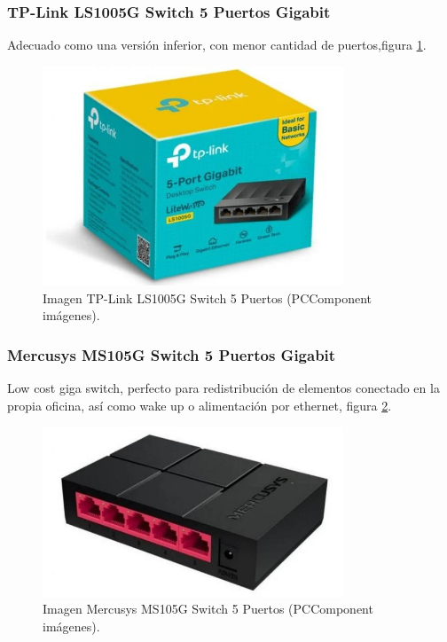 \subsubsection{TP-Link LS1005G Switch 5 Puertos Gigabit}
Adecuado como una versión inferior, con menor cantidad de puertos,figura \ref{F:giga_switch_5p}.
\begin{figure}[htbp]
\begin{center}
\includegraphics[width=0.8\textwidth]{./figuras/giga_switch_5p}
\caption{Imagen TP-Link LS1005G Switch 5 Puertos (PCComponent imágenes).}
\label{F:giga_switch_5p}
\end{center}
\end{figure}
\subsubsection{Mercusys MS105G Switch 5 Puertos Gigabit}
Low cost giga switch, perfecto para redistribución de elementos conectado en la propia oficina, así como wake up o alimentación por ethernet, figura \ref{F:lowcost_giga_switch}.
\begin{figure}[htbp]
\begin{center}
\includegraphics[width=0.8\textwidth]{./figuras/lowcost_giga_switch}
\caption{Imagen Mercusys MS105G Switch 5 Puertos (PCComponent imágenes).}
\label{F:lowcost_giga_switch}
\end{center}
\end{figure}

